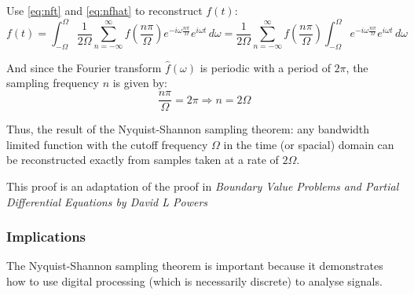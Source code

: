\documentclass[12pt]{article}
\newcommand{\inftyint}{\int_{-\infty}^{\infty}}
\begin{document}
Use \eqref{eq:nft} and \eqref{eq:nfhat} to reconstruct \( f(t)  \):
\begin{equation} \label{eq:ndtft} f(t) = \int_{-\Omega}^{\Omega}
    \frac{1}{2\Omega} \sum_{n = -\infty}^{\infty} f(\frac{n\pi}{\Omega})e^{-i
    \omega \frac{n \pi}{\Omega} } e^{i\omega t} \,d\omega = \frac{1}{2\Omega}
    \sum_{n = -\infty}^{\infty} f(\frac{n\pi}{\Omega}) \int_{-\Omega}^{\Omega}
    e^{-i \omega \frac{n \pi}{\Omega} } e^{i\omega t} \, d\omega \end{equation}

And since the Fourier transform \( \hat{f}(\omega) \) is periodic with a period
of \( 2\pi\), the sampling frequency \( n\) is given by: \[ \frac{n\pi}{\Omega}
= 2\pi \Rightarrow n = 2\Omega\]

Thus, the result of the Nyquist-Shannon sampling theorem: any bandwidth limited
function with the cutoff frequency \( \Omega \) in the time (or spacial) domain
can be reconstructed exactly from samples taken at a rate of \( 2\Omega \).

This proof is an adaptation of the proof in \emph{Boundary Value Problems and
Partial Differential Equations by David L Powers}

%
%


\subsubsection{Implications}

The Nyquist-Shannon sampling theorem is important because it demonstrates how
to use digital processing (which is necessarily discrete) to analyse signals. 
\end{document}

